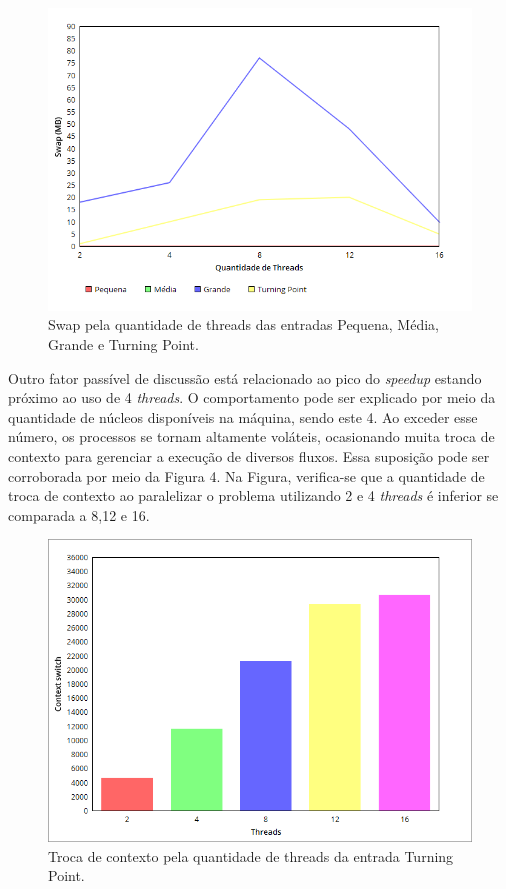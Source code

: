 \documentclass[letterpaper, 10 pt, conference]{ieeeconf}  %
\begin{document}
\begin{figure}[thpb]
      \centering
      \includegraphics[scale=0.35]{swap.png}
      \caption{ Swap pela quantidade de threads das entradas Pequena, Média, Grande e Turning Point.}
      \label{figurelabel3}
   \end{figure}
   
Outro fator passível de discussão está relacionado ao pico do \textit{speedup} estando próximo ao uso de 4 \textit{threads}. O comportamento pode ser explicado por meio da quantidade de núcleos disponíveis na máquina, sendo este 4. Ao exceder esse número, os processos se tornam altamente voláteis, ocasionando muita troca de contexto para gerenciar a execução de diversos fluxos. Essa suposição pode ser corroborada por meio da Figura 4. Na Figura, verifica-se que a quantidade de troca de contexto ao paralelizar o problema utilizando 2 e 4 \textit{threads} é inferior se comparada a 8,12 e 16. 

\begin{figure}[thpb]
      \centering
      \includegraphics[scale=0.35]{cs.png}
      \caption{ Troca de contexto pela quantidade de threads da entrada Turning Point.}
      \label{figurelabel4}
   \end{figure}
\end{document}
